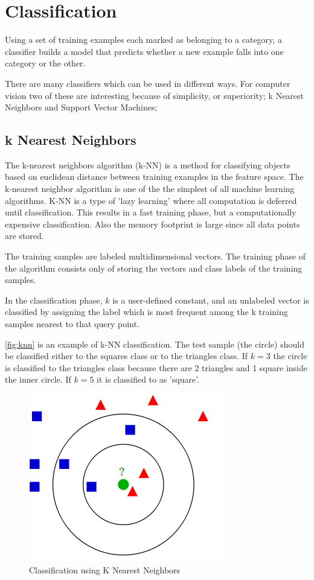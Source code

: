 \section{Classification}
Using a set of training examples each marked as belonging to a category, a classifier builds a model that predicts whether a new example falls into one category or the other. 

There are many classifiers which can be used in different ways. For computer vision two of these are interesting because of simplicity, or superiority; k Nearest Neighbors and Support Vector Machines;

\subsection*{k Nearest Neighbors}
The k-nearest neighbors algorithm (k-NN) is a method for classifying objects based on euclidean distance between training examples in the feature space. The k-nearest neighbor algorithm is one of the the simplest of all machine learning  algorithms. K-NN is a type of 'lazy learning' where all computation is deferred until classification. This results in a fast training phase, but a computationally expensive classification. Also the memory footprint is large since all data points are stored. 

The training samples are labeled multidimensional vectors. The training phase of the algorithm consists only of storing the vectors and class labels of the training samples.

In the classification phase, $k$ is a user-defined constant, and an unlabeled vector is classified by assigning the label which is most frequent among the k training samples nearest to that query point.



\autoref{fig:knn} is an example of k-NN classification. The test sample (the circle) should be classified either to the squares class or to the triangles class. If $k = 3$ the circle is classified to the triangles class because there are 2 triangles and 1 square inside the inner circle. If $k = 5$ it is classified to as 'square'.

\begin{figure}[htbp]
\center{}
\includegraphics[width=0.3\linewidth]{figures/knn.png}
\caption{Classification using K Nearest Neighbors}
\label{fig:knn}
\end{figure}

